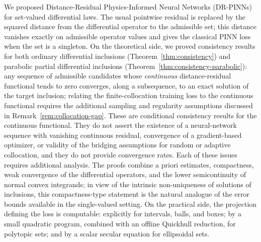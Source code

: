 \documentclass[11pt]{elsarticle}
\theoremstyle{definition}
\theoremstyle{remark}
\numberwithin{equation}{section}
\begin{document}
We proposed  Distance-Residual Physics-Informed Neural Networks
(DR-PINNs) for set-valued differential laws. The usual pointwise residual
is replaced by the squared distance from the differential operator to the
admissible set; this distance vanishes exactly on admissible operator
values and gives the classical PINN loss when the set is a singleton. On the
theoretical side, we proved consistency results for both ordinary
differential inclusions (Theorem~\ref{thm:consistency}) and parabolic
partial differential inclusions
(Theorem~\ref{thm:consistency-parabolic}): any sequence of admissible
candidates whose \emph{continuous} distance-residual functional tends to
zero converges, along a subsequence, to an exact solution of the target
inclusion; relating the finite-collocation training loss to the continuous
functional requires the additional sampling and regularity assumptions
discussed in Remark~\ref{rem:collocation-gap}. These are conditional
consistency results for the continuous functional. They do not assert the
existence of a neural-network sequence with vanishing continuous residual,
convergence of a gradient-based optimizer, or validity of the bridging
assumptions for random or adaptive collocation, and they do not provide
convergence rates. Each of these issues requires additional analysis.
The proofs combine a priori estimates, compactness, weak convergence of the
differential operators, and the lower semicontinuity of normal convex
integrands; in view of the intrinsic non-uniqueness of solutions of
inclusions, this compactness-type statement is the natural analogue of
the error bounds available in the single-valued setting. On the practical
side, the projection defining the loss is computable: explicitly for
intervals, balls, and boxes; by a small quadratic program, combined with
an offline Quickhull reduction, for polytopic sets; and by a scalar
secular equation for ellipsoidal sets.
\end{document}
